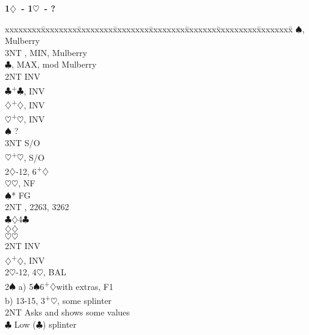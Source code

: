 \documentclass[10pt]{article}
\renewcommand{\c}{$\clubsuit$}
\renewcommand{\d}{$\diamondsuit$}
\newcommand{\h}{$\heartsuit$}
\newcommand{\s}{$\spadesuit$}
\newcommand{\p}{\textsuperscript{+}}
\newenvironment{bidtable}[1][]
{\textbf{#1}
  \begin{adjustwidth}{1em}{}
    \addvspace{2pt}
    \begin{tabbing}
      xxxxxxxx\=xxxxxxxx\=xxxxxxxx\=xxxxxxxx\=xxxxxxxx\=xxxxxxx\=xxxxxxxxx\=xxxxxxxx\=\kill}
{\end{tabbing}\end{adjustwidth}\bigskip}%
\begin{document}
\begin{bidtable}[1\d\ - 1\h\ - ?]
     \>      \s {}, Mulberry                           \\
     \>      \> 3NT , MIN, Mulberry                      \\
     \>      \c {}, MAX, mod Mulberry                  \\
     \> 2NT  \> INV                                             \\
     \c  {}\p\c, INV                                      \\
     \d  {}\p\d, INV                                      \\
     \h  {}\p\h, INV                                      \\
     \s  \> ?                                               \\
     \> 3NT  \> S/O                                             \\
     \h  {}\p\h, S/O                                      \\
2\d  {}-12, 6\p\d                                            \\
     \h  {}\h, NF                                         \\
     \s* \> FG                                              \\
     \>      \> 2NT , 2263, 3262                         \\
     \>      \c {}\d 4\c                                  \\
     \>      \d {}\d                                      \\
     \>      \h {}\h                                      \\
     \> 2NT  \> INV                                             \\
     \d  {}\p\d, INV                                      \\
2\h  {}-12, 4\h, BAL                                         \\
2\s  \> a) 5\s 6\p\d with extras, F1                            \\%
     \> b) 13-15, 3\p\h, some splinter                          \\%
     \> 2NT  \> Asks and shows some values                      \\
     \>      \c \> Low (\c) splinter                        \\

\end{bidtable}
\end{document}
